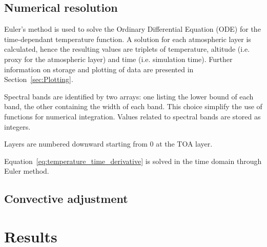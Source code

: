 \documentclass[a4paper,10pt,twocolumn,\classoptions]{article}
\begin{document}
\subsection{Numerical resolution}
\label{sec:Numerical resolution}

Euler's method is used to solve the Ordinary Differential Equation (ODE) for the time-dependant temperature function.
A solution for each atmospheric layer is calculated, hence the resulting values are triplets of temperature, altitude (i.e. proxy for the atmospheric layer) and time (i.e. simulation time). Further information on storage and plotting of data are presented in Section~\ref{sec:Plotting}.

Spectral bands are identified by two arrays: one listing the lower bound of each band, the other containing the width of each band. This choice simplify the use of functions for numerical integration. Values related to spectral bands are stored as integers.

Layers are numbered downward starting from 0 at the TOA layer.

Equation~\eqref{eq:temperature_time_derivative} is solved in the time domain through Euler method. %




\subsection{Convective adjustment}
\label{sec:Convective adjustment}



\section{Results}
\end{document}
